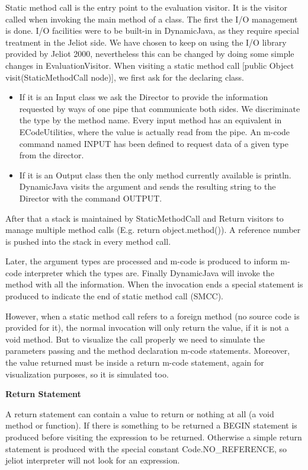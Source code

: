 Static method call is the entry point to the evaluation visitor. It is the visitor called when invoking the main method of a class.
The first the I/O management is done. I/O facilities were to be built-in in DynamicJava, as they require special treatment in the Jeliot side. We have chosen to keep on using the I/O library provided by Jeliot 2000, nevertheless this can be changed by doing some simple changes in EvaluationVisitor. When visiting a static method call [public Object visit(StaticMethodCall node)], we first ask for the declaring class.

\begin{itemize}
\item If it is an Input class we ask the Director to provide the information requested by ways of one pipe that communicate both sides. We discriminate the type by the method name. Every input method has an equivalent in ECodeUtilities, where the value is actually read from the pipe. An m-code command named INPUT has been defined to request data of a given type from the director.
\item If it is an Output class then the only method currently available is println. DynamicJava visits the argument and sends the resulting string to the Director with the command OUTPUT.
\end{itemize}

After that a stack is maintained by StaticMethodCall and Return visitors to manage multiple method calls (E.g. return object.method()). A reference number is pushed into the stack in every method call.

Later, the argument types are processed and m-code is produced to inform m-code interpreter which the types are. Finally DynamicJava will invoke the method with all the information. When the invocation ends a special statement is produced to indicate the end of static method call (SMCC).

However, when a static method call refers to a foreign method (no source code is provided for it), the normal invocation will only return the value, if it is not a void method. But to visualize the call properly we need to simulate the parameters passing and the method declaration m-code statements. Moreover, the value returned must be inside a return m-code statement, again for visualization purposes, so it is simulated too.

{\bf{Return Statement}}

A return statement can contain a value to return or nothing at all (a void method or function). If there is something to be returned a BEGIN statement is produced before visiting the expression to be returned. Otherwise a simple return statement is produced with the special constant Code.NO\_REFERENCE, so jeliot interpreter will not look for an expression.

